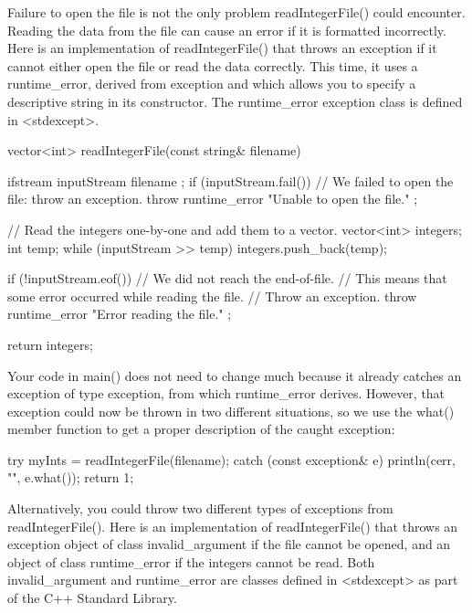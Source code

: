 
Failure to open the file is not the only problem readIntegerFile() could encounter. Reading the data from the file can cause an error if it is formatted incorrectly. Here is an implementation of readIntegerFile() that throws an exception if it cannot either open the file or read the data correctly. This time, it uses a runtime\_error, derived from exception and which allows you to specify a descriptive string in its constructor. The runtime\_error exception class is defined in <stdexcept>.

\begin{cpp}
vector<int> readIntegerFile(const string& filename)
{
    ifstream inputStream { filename };
    if (inputStream.fail()) {
        // We failed to open the file: throw an exception.
        throw runtime_error { "Unable to open the file." };
    }

    // Read the integers one-by-one and add them to a vector.
    vector<int> integers;
    int temp;
    while (inputStream >> temp) {
        integers.push_back(temp);
    }

    if (!inputStream.eof()) {
        // We did not reach the end-of-file.
        // This means that some error occurred while reading the file.
        // Throw an exception.
        throw runtime_error { "Error reading the file." };
    }

    return integers;
}
\end{cpp}

Your code in main() does not need to change much because it already catches an exception of type exception, from which runtime\_error derives. However, that exception could now be thrown in two different situations, so we use the what() member function to get a proper description of the caught exception:

\begin{cpp}
try {
    myInts = readIntegerFile(filename);
} catch (const exception& e) {
    println(cerr, "{}", e.what());
    return 1;
}
\end{cpp}

Alternatively, you could throw two different types of exceptions from readIntegerFile(). Here is an implementation of readIntegerFile() that throws an exception object of class invalid\_argument if the file cannot be opened, and an object of class runtime\_error if the integers cannot be read. Both invalid\_argument and runtime\_error are classes defined in <stdexcept> as part of the C++ Standard Library.

